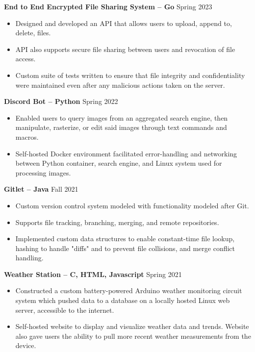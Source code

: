 \documentclass{article}
\begin{document}

\begin{adjustwidth}{1em}{1em}

    \textbf{End to End Encrypted File Sharing System -- Go} \hfill Spring 2023
    \begin{itemize}
        \item Designed and developed an API that allows users to upload, append to, delete, files.
        \item API also supports secure file sharing between users and revocation of file access.
        \item Custom suite of tests written to ensure that file integrity and confidentiality were maintained even after any malicious actions taken on the server.
    \end{itemize}

    \vspace{1mm}

    \textbf{Discord Bot -- Python} \hfill Spring 2022
    \begin{itemize}
        \item Enabled users to query images from an aggregated search engine, then manipulate, rasterize, or edit said images through text commands and macros.
        \item Self-hosted Docker environment facilitated error-handling and networking between Python container, search engine, and Linux system used for processing images.
    \end{itemize}

    \textbf{Gitlet -- Java} \hfill Fall 2021
    \begin{itemize}
        \item Custom version control system modeled with functionality modeled after Git.
        \item Supports file tracking, branching, merging, and remote repositories.
        \item Implemented custom data structures to enable constant-time file lookup, hashing to handle "diffs" and to prevent file collisions, and merge conflict handling.
    \end{itemize}

    \vspace{1mm}

    \noindent \textbf{Weather Station -- C, HTML, Javascript} \hfill Spring 2021
    \begin{itemize}
        \item Constructed a custom battery-powered Arduino weather monitoring circuit system which pushed data to a database on a locally hosted Linux web server, accessible to the internet.
        \item Self-hosted website to display and visualize weather data and trends. Website also gave users the ability to pull more recent weather measurements from the device.
    \end{itemize}


\end{adjustwidth}
\end{document}
